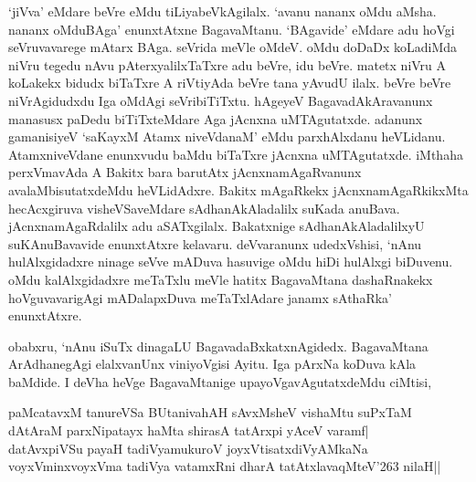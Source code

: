 `jiVva' eMdare beVre eMdu tiLiyabeVkAgilalx. `avanu nananx oMdu aMsha. nananx oMduBAga' enunxtAtxne BagavaMtanu. `BAgavide' eMdare adu hoVgi seVruvavarege mAtarx BAga. seVrida meVle oMdeV. oMdu doDaDx koLadiMda niVru tegedu nAvu pAterxyalilxTaTxre adu beVre, idu beVre. matetx niVru A koLakekx bidudx biTaTxre A riVtiyAda beVre tana yAvudU ilalx. beVre beVre niVrAgidudxdu Iga oMdAgi seVribiTiTxtu. hAgeyeV BagavadAkAravanunx manasusx paDedu biTiTxteMdare Aga jAcnxna uMTAgutatxde. adanunx gamanisiyeV `saKayxM Atamx niveVdanaM' eMdu parxhAlxdanu heVLidanu. AtamxniveVdane enunxvudu baMdu biTaTxre jAcnxna uMTAgutatxde. iMthaha perxVmavAda A Bakitx bara barutAtx jAcnxnamAgaRvanunx avalaMbisutatxdeMdu heVLidAdxre. Bakitx mAgaRkekx jAcnxnamAgaRkikxMta hecAcxgiruva visheVSaveMdare sAdhanAkAladalilx suKada anuBava. jAcnxnamAgaRdalilx adu aSATxgilalx. Bakatxnige sAdhanAkAladalilxyU suKAnuBavavide enunxtAtxre kelavaru. deVvaranunx udedxVshisi, `nAnu hulAlxgidadxre ninage seVve mADuva hasuvige oMdu hiDi hulAlxgi biDuvenu. oMdu kalAlxgidadxre meTaTxlu meVle hatitx BagavaMtana dashaRnakekx hoVguvavarigAgi mADalapxDuva meTaTxlAdare janamx sAthaRka' enunxtAtxre.

obabxru, `nAnu iSuTx dinagaLU BagavadaBxkatxnAgidedx. BagavaMtana ArAdhanegAgi elalxvanUnx viniyoVgisi Ayitu. Iga pArxNa koDuva kAla baMdide. I deVha heVge BagavaMtanige upayoVgavAgutatxdeMdu ciMtisi,

\begin{shloka}
paMcatavxM tanureVSa BUtanivahAH sAvxMsheV vishaMtu suPxTaM\\
dAtAraM parxNipatayx haMta shirasA tatArxpi yAceV varamf|\\
datAvxpiVSu payaH tadiVyamukuroV joyxVtisatxdiVyAMkaNa\\
voyxVminxvoyxVma tadiVya vatamxRni dharA tatAtxlavaqMteV\char'263 nilaH||
\end{shloka}

